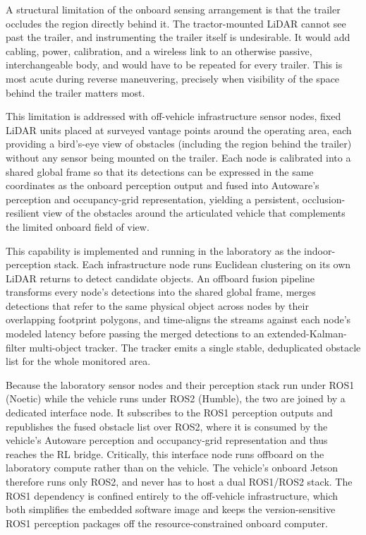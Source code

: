 A structural limitation of the onboard sensing arrangement is that the trailer occludes the region directly behind it. The tractor-mounted LiDAR cannot see past the trailer, and instrumenting the trailer itself is undesirable. It would add cabling, power, calibration, and a wireless link to an otherwise passive, interchangeable body, and would have to be repeated for every trailer. This is most acute during reverse maneuvering, precisely when visibility of the space behind the trailer matters most.

This limitation is addressed with off-vehicle infrastructure sensor nodes, fixed LiDAR units placed at surveyed vantage points around the operating area, each providing a bird's-eye view of obstacles (including the region behind the trailer) without any sensor being mounted on the trailer. Each node is calibrated into a shared global frame so that its detections can be expressed in the same coordinates as the onboard perception output and fused into Autoware's perception and occupancy-grid representation, yielding a persistent, occlusion-resilient view of the obstacles around the articulated vehicle that complements the limited onboard field of view.

This capability is implemented and running in the laboratory as the indoor-perception stack. Each infrastructure node runs Euclidean clustering on its own LiDAR returns to detect candidate objects. An offboard fusion pipeline transforms every node's detections into the shared global frame, merges detections that refer to the same physical object across nodes by their overlapping footprint polygons, and time-aligns the streams against each node's modeled latency before passing the merged detections to an extended-Kalman-filter multi-object tracker. The tracker emits a single stable, deduplicated obstacle list for the whole monitored area.

Because the laboratory sensor nodes and their perception stack run under ROS1 (Noetic) while the vehicle runs under ROS2 (Humble), the two are joined by a dedicated interface node. It subscribes to the ROS1 perception outputs and republishes the fused obstacle list over ROS2, where it is consumed by the vehicle's Autoware perception and occupancy-grid representation and thus reaches the RL bridge. Critically, this interface node runs offboard on the laboratory compute rather than on the vehicle. The vehicle's onboard Jetson therefore runs only ROS2, and never has to host a dual ROS1/ROS2 stack. The ROS1 dependency is confined entirely to the off-vehicle infrastructure, which both simplifies the embedded software image and keeps the version-sensitive ROS1 perception packages off the resource-constrained onboard computer.

